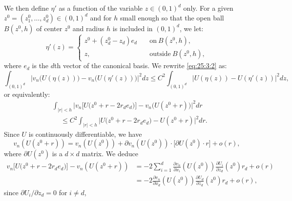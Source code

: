 \documentclass[11pt]{amsart}
\begin{document}
We then define $\eta'$ as a function of the variable $z \in (0,1)^d$ only. For a given $z^{0}=(z^{0}_{1},\dots,z^{0}_{d}) \in (0,1)^d$ and for $h$ small enough so that the open ball $B(z^0,h)$ of center $z^{0}$ and radius $h$ is included in $(0,1)^d$, we let:
\begin{equation*}
\eta'(z)=
\left\{ \begin{array}{ll}
z^0 + (  z^{0}_{d} - z_{d}) e_{d} &\quad \textrm{on} \ B(z^0,h),
\\
z, &\quad \textrm{outside} \ B(z^0,h),
\end{array}
\right.
\end{equation*}
where $e_{d}$ is the $d$th vector of the canonical basis. 
We rewrite \eqref{eq:25:3:2} as:
\begin{equation*}
\int_{(0,1)^d} \bigl\vert v_{n}\bigl(U(\eta(z))\bigr) - v_{n}\bigl(U(\eta'(z))\bigr) \bigr\vert^2 dz \leq 
C^2 \int_{(0,1)^d} \bigl\vert U(\eta(z)) -U(\eta'(z)) \bigr\vert^2 dz,
\end{equation*}
or equivalently:
\begin{equation}
\label{fo:50}
\begin{split}
&\int_{\vert r \vert < h} \bigl\vert v_{n}\bigl[U \bigl(z^{0} + r - 2 r_{d} e_{d} \bigr) \bigr]
 - v_{n}\bigl(U(z^{0} + r)\bigr) \bigr\vert^2 dr 
\\
&\hspace{15pt} \leq 
C^2 \int_{\vert r \vert < h} \bigl\vert U\bigl( z^{0}+ r - 2 r_{d} e_{d} \bigr)
-U(z^{0}+r) \bigr\vert^2 dr.
\end{split}
\end{equation}
Since $U$ is continuously differentiable, we have 
\begin{equation*}
v_{n}(U(z^{0}+r)) = v_{n}(U(z^{0})) + \partial v_{n}(U(z^{0}))  \cdot \bigl[ \partial U(z^0) \cdot r \bigr] + o(r),
\end{equation*}
where $\partial U(z^0)$ is a $d \times d$ matrix. 
We deduce
\begin{equation*}
\begin{split}
v_{n}\bigl[ U \bigl(z^{0}+ r - 2r_{d} e_{d}
\bigr)\bigr] - v_{n}(U(z^{0}+r))  &= - 2 \sum_{i=1}^d 
\frac{\partial v_{n}}{\partial x_{i}}(U(z^{0}))
\frac{\partial U_{i}}{\partial z_{d}}(z^{0}) r_{d}+ o(r)
\\
&= - 2 \frac{\partial v_{n}}{\partial x_{d}}(U(z^{0}))
\frac{\partial U_{d}}{\partial z_{d}}(z^{0}) r_{d}+ o(r),
\end{split}
\end{equation*}
since $\partial U_{i}/\partial z_{d} =0$ for $i \not = d$,
\end{document}
